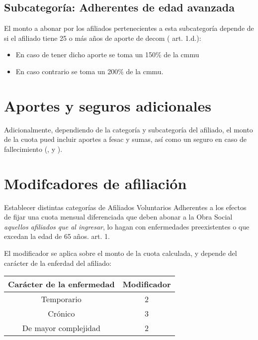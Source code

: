 \subsection{Subcategoría: Adherentes de edad avanzada}
El monto a abonar por los afiliados pertenecientes a esta subcategoría depende de si el afiliado tiene 25 o más años de aporte de \acrfull{decom} (\cite{dospuRes7} art. 1.d.):
\begin{itemize}
    \item En caso de tener dicho aporte se toma un 150\% de la \acrshort{cmmu}
    \item En caso contrario se toma un 200\% de la \acrshort{cmmu}.
\end{itemize}

\section{Aportes y seguros adicionales}
Adicionalmente, dependiendo de la categoría y subcategoría del afiliado, el monto de la cuota pued incluir aportes a \acrfull{fesac} y \acrfull{sumas}, así como un seguro en caso de fallecimiento (\cite{dospuRes31}, \cite{dospuRes43} y \cite{dospuRes71}).

\section{Modifcadores de afiliación}
\begin{displayquote}
Establecer distintas categorías de Afiliados Voluntarios Adherentes a los efectos de fijar una cuota mensual diferenciada que deben abonar a la Obra Social \emph{aquellos afiliados que al ingresar}, lo hagan con enfermedades preexistentes o que excedan la edad de 65 años. 
\hfill\parencite{dospuRes7} art. 1.
\end{displayquote}

El modificador se aplica sobre el monto de la cuota calculada, y depende del carácter de la enferdad del afiliado:

\begin{table}[H]
    \centering
\begin{tabular}{|c|c|}
    \hline
    Carácter de la enfermedad & Modificador \\ \hline
    Temporario & 2 \\ \hline
    Crónico & 3 \\ \hline
    De mayor complejidad & 2 \\ \hline
\end{tabular}
\end{table}

